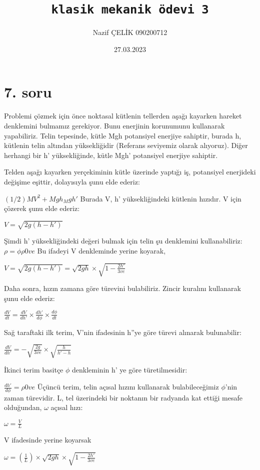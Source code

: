 \documentclass[12pt]{article}
\title{ \texttt{klasik mekanik ödevi 3}}
\author{Nazif ÇELİK 090200712}
\date{27.03.2023}
\begin{document}
\maketitle
\href{https://github.com/naxifcelik/classical-mechanics/blob/main/hw3.tex}
\newpage
\large
\section{7. soru}
Problemi çözmek için önce noktasal kütlenin tellerden aşağı kayarken hareket denklemini bulmamız gerekiyor. Bunu enerjinin korunumunu kullanarak yapabiliriz. Telin tepesinde, kütle Mgh potansiyel enerjiye sahiptir, burada h, kütlenin telin altından yüksekliğidir (Referans seviyemiz olarak alıyoruz). Diğer herhangi bir h' yüksekliğinde, kütle Mgh' potansiyel enerjiye sahiptir.

Telden aşağı kayarken yerçekiminin kütle üzerinde yaptığı iş, potansiyel enerjideki değişime eşittir, dolayısıyla şunu elde ederiz:

$(1/2)MV^2+Mgh_Mgh'$
Burada V, h' yüksekliğindeki kütlenin hızıdır. V için çözerek şunu elde ederiz:

$V=\sqrt{2g(h-h')}$

Şimdi h' yüksekliğindeki değeri bulmak için telin şu denklemini kullanabiliriz:
$\rho=\phi\rho0ve$
Bu ifadeyi V denkleminde yerine koyarak,

$V=\sqrt{2g(h-h')}=\sqrt{2gh}\times\sqrt{1-\frac{2h'}{3ve}}$

Daha sonra, hızın zamana göre türevini bulabiliriz. Zincir kuralını kullanarak şunu elde ederiz:

$\frac{dV}{dt}=\frac{dV}{dh'}\times\frac{dh'}{d\phi}\times\frac{d\phi}{dt}$

Sağ taraftaki ilk terim, V'nin ifadesinin h''ye göre türevi alınarak bulunabilir:

$\frac{dV}{dh'}=-\sqrt{\frac{2g}{3ve}}\times\sqrt{\frac{h}{h'-h}}$

İkinci terim basitçe $\phi$ denkleminin h' ye göre türetilmesidir:

$\frac{dh'}{d\phi}=\rho0ve$
\newpage
Üçüncü terim, telin açısal hızını kullanarak bulabileceğimiz $\phi$'nin zaman türevidir. L, tel üzerindeki bir noktanın bir radyanda kat ettiği mesafe olduğundan, $\omega$ açısal hızı:

$\omega=\frac{V}{L}$

V ifadesinde yerine koyarsak

$\omega=(\frac{1}{L})\times\sqrt{2gh}\times\sqrt{1-\frac{2h'}{3ve}}$
\end{document}
